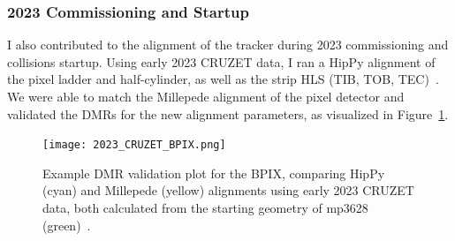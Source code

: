 
\subsubsection{2023 Commissioning and Startup}

I also contributed to the alignment of the tracker during 2023 commissioning and collisions startup. Using early 2023 CRUZET data, I ran a HipPy alignment of the pixel ladder and half-cylinder, as well as the strip HLS (TIB, TOB, TEC)~\cite{Untitled59:online, WeeklyTr66:online}. We were able to match the Millepede alignment of the pixel detector and validated the DMRs for the new alignment parameters, as visualized in Figure~\ref{fig:2023_CRUZET_BPIX}. 

\begin{figure}[!htb]
    \begin{center}
        \texttt{[image: 2023\_CRUZET\_BPIX.png]}
        \caption{Example DMR validation plot for the BPIX, comparing HipPy (cyan) and Millepede (yellow) alignments using early 2023 CRUZET data, both calculated from the starting geometry of mp3628 (green)~\cite{WeeklyTr66:online}.}
        \label{fig:2023_CRUZET_BPIX}
    \end{center}
\end{figure}






